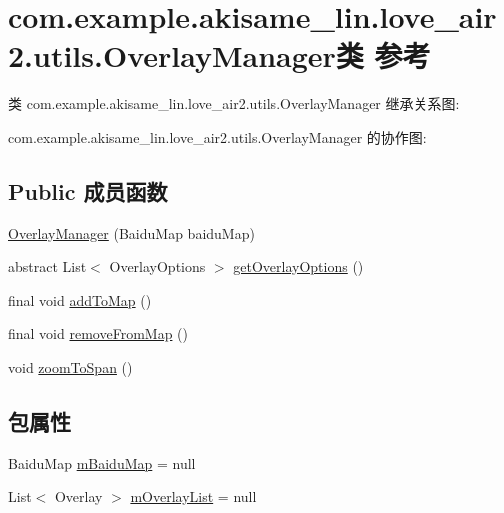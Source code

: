 \hypertarget{classcom_1_1example_1_1akisame__lin_1_1love__air2_1_1utils_1_1_overlay_manager}{}\section{com.\+example.\+akisame\+\_\+lin.\+love\+\_\+air2.\+utils.\+Overlay\+Manager类 参考}
\label{classcom_1_1example_1_1akisame__lin_1_1love__air2_1_1utils_1_1_overlay_manager}


类 com.\+example.\+akisame\+\_\+lin.\+love\+\_\+air2.\+utils.\+Overlay\+Manager 继承关系图\+:


com.\+example.\+akisame\+\_\+lin.\+love\+\_\+air2.\+utils.\+Overlay\+Manager 的协作图\+:
\subsection*{Public 成员函数}
\begin{DoxyCompactItemize}
\item 
\mbox{\hyperlink{classcom_1_1example_1_1akisame__lin_1_1love__air2_1_1utils_1_1_overlay_manager_ad74ec83ee7b547fb38569b0d8502b390}{Overlay\+Manager}} (Baidu\+Map baidu\+Map)
\item 
abstract List$<$ Overlay\+Options $>$ \mbox{\hyperlink{classcom_1_1example_1_1akisame__lin_1_1love__air2_1_1utils_1_1_overlay_manager_ab43fa6415de888d480d913d1b924b309}{get\+Overlay\+Options}} ()
\item 
final void \mbox{\hyperlink{classcom_1_1example_1_1akisame__lin_1_1love__air2_1_1utils_1_1_overlay_manager_a24ae8c26fe0b12334e47b7d6750934b1}{add\+To\+Map}} ()
\item 
final void \mbox{\hyperlink{classcom_1_1example_1_1akisame__lin_1_1love__air2_1_1utils_1_1_overlay_manager_aac0bce20620393dac45943920a42bf3b}{remove\+From\+Map}} ()
\item 
void \mbox{\hyperlink{classcom_1_1example_1_1akisame__lin_1_1love__air2_1_1utils_1_1_overlay_manager_a0378e30878118dc7cf782d6ec3f53de4}{zoom\+To\+Span}} ()
\end{DoxyCompactItemize}
\subsection*{包属性}
\begin{DoxyCompactItemize}
\item 
Baidu\+Map \mbox{\hyperlink{classcom_1_1example_1_1akisame__lin_1_1love__air2_1_1utils_1_1_overlay_manager_a31aa73745cf259b0dfe206deb34d2a9c}{m\+Baidu\+Map}} = null
\item 
List$<$ Overlay $>$ \mbox{\hyperlink{classcom_1_1example_1_1akisame__lin_1_1love__air2_1_1utils_1_1_overlay_manager_ab43b42db742ecd7014645c458d5c4463}{m\+Overlay\+List}} = null
\end{DoxyCompactItemize}
